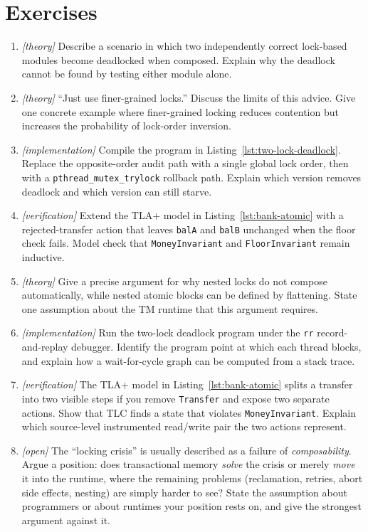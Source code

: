 \section{Exercises}
\label{sec:ch1-exercises}

\begin{enumerate}
\item \emph{[theory]} Describe a scenario in which two independently
correct lock-based modules become deadlocked when composed. Explain
why the deadlock cannot be found by testing either module alone.

\item \emph{[theory]} ``Just use finer-grained locks.'' Discuss the limits
of this advice. Give one concrete example where finer-grained locking
reduces contention but increases the probability of lock-order
inversion.

\item \emph{[implementation]} Compile the program in
Listing~\ref{lst:two-lock-deadlock}. Replace the opposite-order audit
path with a single global lock order, then with a
\texttt{pthread\_mutex\_trylock} rollback path. Explain which version
removes deadlock and which version can still starve.

\item \emph{[verification]} Extend the TLA+ model in
Listing~\ref{lst:bank-atomic} with a rejected-transfer action that
leaves \texttt{balA} and \texttt{balB} unchanged when the floor check
fails. Model check that \texttt{MoneyInvariant} and
\texttt{FloorInvariant} remain inductive.

\item \emph{[theory]} Give a precise argument for why nested locks do not
compose automatically, while nested atomic blocks can be defined by
flattening. State one assumption about the TM runtime that this
argument requires.

\item \emph{[implementation]} Run the two-lock deadlock program under the
\texttt{rr} record-and-replay debugger. Identify the program point at
which each thread blocks, and explain how a wait-for-cycle graph can be
computed from a stack trace.

\item \emph{[verification]} The TLA+ model in Listing~\ref{lst:bank-atomic}
splits a transfer into two visible steps if you remove
\texttt{Transfer} and expose two separate actions. Show that TLC finds
a state that violates \texttt{MoneyInvariant}. Explain which
source-level instrumented read/write pair the two actions represent.

\item \emph{[open]} The ``locking crisis'' is usually described as a
failure of \emph{composability}.  Argue a position: does transactional
memory \emph{solve} the crisis or merely \emph{move} it into the
runtime, where the remaining problems (reclamation, retries, abort
side effects, nesting) are simply harder to see?  State the assumption
about programmers or about runtimes your position rests on, and give
the strongest argument against it.
\end{enumerate}%

